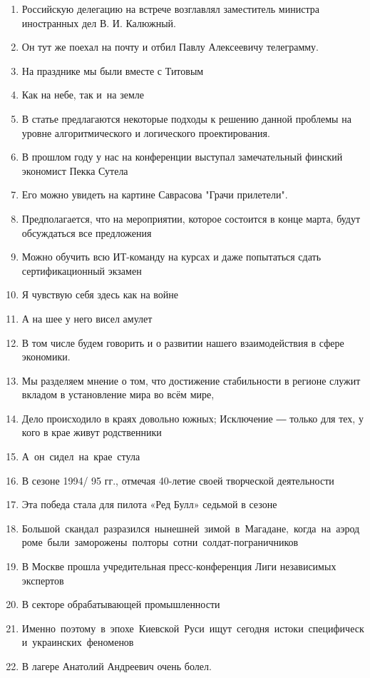 \documentclass[paper=a4, fontsize=11pt]{scrartcl}
\begin{document}
\begin{enumerate}
    \item Российскую делегацию на встрече возглавлял заместитель министра иностранных дел В. И. Калюжный.
    \item Он тут же поехал на почту и отбил Павлу Алексеевичу телеграмму.
    \item На празднике мы были вместе с Титовым
    \item Как на небе, так и на земле
    \item В статье предлагаются некоторые подходы к решению данной проблемы на уровне алгоритмического и логического проектирования. 
    \item В прошлом году у нас на конференции выступал замечательный финский экономист Пекка Сутела
    \item Его можно увидеть на картине Саврасова "Грачи прилетели".
    \item Предполагается, что на мероприятии, которое состоится в конце марта, будут обсуждаться все предложения
    \item Можно обучить всю ИТ-команду на курсах и даже попытаться сдать сертификационный экзамен
    \item Я чувствую себя здесь как на войне
    \item А на шее у него висел амулет
    \item В том числе будем говорить и о развитии нашего взаимодействия в сфере экономики.
    \item Мы разделяем мнение о том, что достижение стабильности в регионе служит вкладом в установление мира во всём мире,
    \item Дело происходило в краях довольно южных; Исключение ― только для тех, у кого в крае живут родственники
    \item А он сидел на крае стула
    \item В сезоне 1994/ 95 гг., отмечая 40-летие своей творческой деятельности
    \item Эта победа стала для пилота «Ред Булл» седьмой в сезоне
    \item Большой скандал разразился нынешней зимой в Магадане, когда на аэродроме были заморожены полторы сотни солдат-пограничников
    \item В Москве прошла учредительная пресс-конференция Лиги независимых экспертов
    \item В секторе обрабатывающей промышленности
    \item Именно поэтому в эпохе Киевской Руси ищут сегодня истоки специфически украинских феноменов
    \item В лагере Анатолий Андреевич очень болел.
\end{enumerate}
\end{document}
